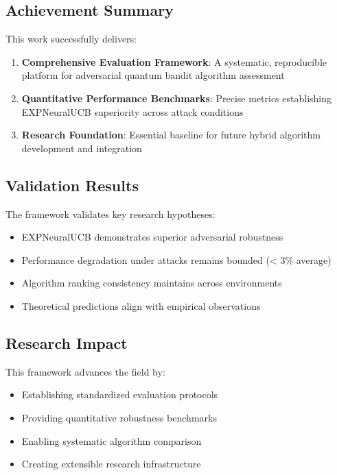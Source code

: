 \documentclass[11pt,a4paper]{article}
\begin{document}
\subsection{Achievement Summary}

This work successfully delivers:

\begin{enumerate}
\item \textbf{Comprehensive Evaluation Framework}: A systematic, reproducible platform for adversarial quantum bandit algorithm assessment
\item \textbf{Quantitative Performance Benchmarks}: Precise metrics establishing EXPNeuralUCB superiority across attack conditions
\item \textbf{Research Foundation}: Essential baseline for future hybrid algorithm development and integration
\end{enumerate}

\subsection{Validation Results}

The framework validates key research hypotheses:
\begin{itemize}
\item EXPNeuralUCB demonstrates superior adversarial robustness
\item Performance degradation under attacks remains bounded (< 3\% average)
\item Algorithm ranking consistency maintains across environments
\item Theoretical predictions align with empirical observations
\end{itemize}

\subsection{Research Impact}

This framework advances the field by:
\begin{itemize}
\item Establishing standardized evaluation protocols
\item Providing quantitative robustness benchmarks  
\item Enabling systematic algorithm comparison
\item Creating extensible research infrastructure
\end{itemize}
\end{document}
